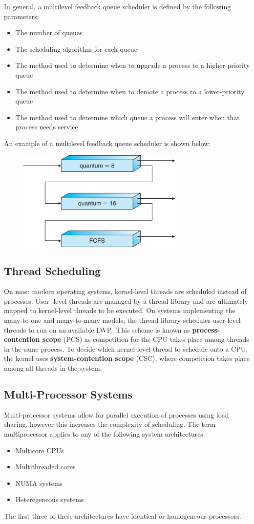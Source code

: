 \documentclass{article}
\begin{document}
In general, a multilevel feedback queue scheduler is defined by the
following parameters:
\begin{itemize}
    \item The number of queues
    \item The scheduling algorithm for each queue
    \item The method used to determine when to upgrade a process to a
          higher-priority queue
    \item The method used to determine when to demote a process to a
          lower-priority queue
    \item The method used to determine which queue a process will enter
          when that process needs service
\end{itemize}
An example of a multilevel feedback queue scheduler is shown below:
\begin{figure}[H]
    \centering
    \includegraphics[height = 5cm]{figures/multiple_feedback_queue_scheduling.pdf}
\end{figure}
\subsection{Thread Scheduling}
On most modern operating systems, kernel-level threads are scheduled
instead of processes. User- level threads are managed by a thread
library and are ultimately mapped to kernel-level threads to be
executed. On systems implementing the many-to-one and many-to-many
models, the thread library schedules user-level threads to run on an
available LWP.\ This scheme is known as \linebreak
\textbf{process-contention scope} (PCS) as competition for the CPU
takes place among threads in the same process. To decide which
kernel-level thread to schedule onto a CPU, the kernel uses
\textbf{system-contention scope} (CSC), where competition takes place
among all threads in the system.
\subsection{Multi-Processor Systems}
Multi-processor systems allow for parallel execution of processes using
load sharing, however this increases the complexity of scheduling. The
term multiprocessor applies to any of the following system
architectures:
\begin{itemize}
    \item Multicore CPUs
    \item Multithreaded cores
    \item NUMA systems
    \item Heteregeneous systems
\end{itemize}
The first three of these architectures have identical or homogeneous
processors.
\end{document}
